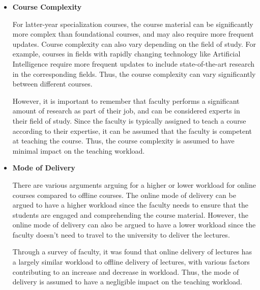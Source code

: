 \begin{itemize}
  \item  \textbf{Course Complexity}

        For latter-year specialization courses, the course material can be significantly more complex than foundational courses, and may also require more frequent updates. Course complexity can also vary depending on the field of study. For example, courses in fields with rapidly changing technology like Artificial Intelligence require more frequent updates to include state-of-the-art research in the corresponding fields. Thus, the course complexity can vary significantly between different courses.

        However, it is important to remember that faculty performs a significant amount of research as part of their job, and can be considered experts in their field of study. Since the faculty is typically assigned to teach a course according to their expertise, it can be assumed that the faculty is competent at teaching the course. Thus, the course complexity is assumed to have minimal impact on the teaching workload.

  \item \textbf{Mode of Delivery}

        There are various arguments arguing for a higher or lower workload for online courses compared to offline courses. The online mode of delivery can be argued to have a higher workload since the faculty needs to ensure that the students are engaged and comprehending the course material. However, the online mode of delivery can also be argued to have a lower workload since the faculty doesn't need to travel to the university to deliver the lectures.

        Through a survey of faculty, it was found that online delivery of lectures has a largely similar workload to offline delivery of lectures, with various factors contributing to an increase and decrease in workload. Thus, the mode of delivery is assumed to have a negligible impact on the teaching workload.

\end{itemize}

